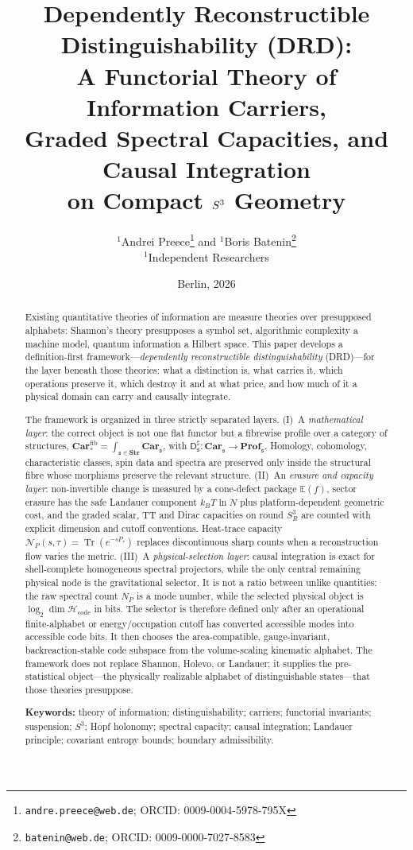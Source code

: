 \documentclass[11pt,a4paper]{article}
\title{\bfseries Dependently Reconstructible Distinguishability (DRD):\\
A Functorial Theory of Information Carriers,\\
Graded Spectral Capacities, and Causal Integration\\
on Compact \texorpdfstring{$\Sthree$}{S3} Geometry}
\author{%
\texorpdfstring{$^{1}$}{1}Andrei Preece\thanks{\texttt{andre.preece@web.de}; ORCID: 0009-0004-5978-795X}
\quad and \quad
\texorpdfstring{$^{1}$}{1}Boris Batenin\thanks{\texttt{batenin@web.de}; ORCID: 0009-0000-7027-8583}\\[0.35em]
\small \texorpdfstring{$^{1}$}{1}Independent Researchers
}
\date{Berlin, 2026}
\theoremstyle{definition}
\theoremstyle{remark}
\newcommand{\Sthree}{S^{3}}
\newcommand{\Dsharp}{\mathsf{D}^{\sharp}}
\newcommand{\Car}{\mathbf{Car}}
\newcommand{\Str}{\mathbf{Str}}
\begin{document}
\maketitle

\begin{abstract}
Existing quantitative theories of information are measure theories over presupposed alphabets:
Shannon's theory presupposes a symbol set, algorithmic complexity a machine model, quantum
information a Hilbert space.  This paper develops a definition-first framework---\emph{dependently
reconstructible distinguishability} (DRD)---for the layer beneath those theories: what a
distinction is, what carries it, which operations preserve it, which destroy it and at what
price, and how much of it a physical domain can carry and causally integrate.

The framework is organized in three strictly separated layers.  (I)~A \emph{mathematical layer}:
the correct object is not one flat functor but a fibrewise profile over a category of structures,
$\Car_*^{\mathrm{fib}}=\int_{\mathfrak s\in\Str}\Car_{\mathfrak s}$, with
$\Dsharp_{\mathfrak s}:\Car_{\mathfrak s}\to\mathbf{Prof}_{\mathfrak s}$.  Homology,
cohomology, characteristic classes, spin data and spectra are preserved only inside the
structural fibre whose morphisms preserve the relevant structure.  (II)~An \emph{erasure and
capacity layer}: non-invertible change is measured by a cone-defect package
$\mathbb E(f)$, sector erasure has the safe Landauer component $k_BT\ln N$ plus
platform-dependent geometric cost, and the graded scalar, TT and Dirac capacities on round
$\Sthree_R$ are counted with explicit dimension and cutoff conventions.  Heat-trace capacity
$\mathcal N_P(s,\tau)=\operatorname{Tr}(e^{-sP_\tau})$ replaces discontinuous sharp counts
when a reconstruction flow varies the metric.  (III)~A \emph{physical-selection layer}: causal
integration is exact for shell-complete homogeneous spectral projectors, while the only central
remaining physical node is the gravitational selector.  It is not a ratio between unlike
quantities: the raw spectral count $N_P$ is a mode number, while the selected physical object is
$\log_2\dim\mathcal H_{\mathrm{code}}$ in bits.  The selector is therefore defined only after
an operational finite-alphabet or energy/occupation cutoff has converted accessible modes into
accessible code bits.  It then chooses the area-compatible, gauge-invariant,
backreaction-stable code subspace from the volume-scaling kinematic alphabet.  The framework does not replace Shannon, Holevo, or Landauer; it supplies
the pre-statistical object---the physically realizable alphabet of distinguishable states---that
those theories presuppose.
\medskip

\noindent\textbf{Keywords:} theory of information; distinguishability; carriers; functorial
invariants; suspension; $\Sthree$; Hopf holonomy; spectral capacity; causal integration;
Landauer principle; covariant entropy bounds; boundary admissibility.
\end{abstract}
\end{document}
